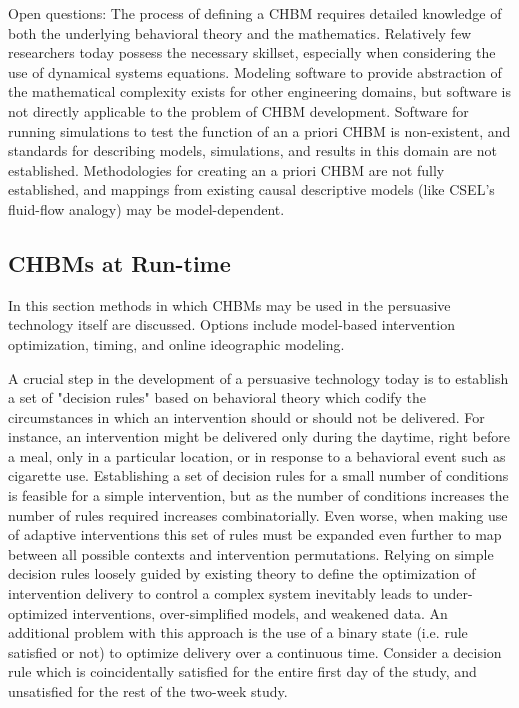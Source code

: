 \documentclass[runningheads,a4paper]{llncs}
\begin{document}
Open questions:
The process of defining a CHBM requires detailed knowledge of both the underlying behavioral theory and the mathematics. Relatively few researchers today possess the necessary skillset, especially when considering the use of dynamical systems equations.
Modeling software to provide abstraction of the mathematical complexity exists for other engineering domains, but software is not directly applicable to the problem of CHBM development. %
Software for running simulations to test the function of an a priori CHBM is non-existent, and standards for describing models, simulations, and results in this domain are not established.
Methodologies for creating an a priori CHBM are not fully established, and mappings from existing causal descriptive models (like CSEL’s fluid-flow analogy) may be model-dependent.

\subsection{CHBMs at Run-time}
In this section methods in which CHBMs may be used in the persuasive technology itself are discussed. 
Options include model-based intervention optimization, timing, and online ideographic modeling.

A crucial step in the development of a persuasive technology today is to establish a set of "decision rules" based on behavioral theory which codify the circumstances in which an intervention should or should not be delivered.
For instance, an intervention might be delivered only during the daytime, right before a meal, only in a particular location, or in response to a behavioral event such as cigarette use.
Establishing a set of decision rules for a small number of conditions is feasible for a simple intervention, but as the number of conditions increases the number of rules required increases combinatorially.
Even worse, when making use of adaptive interventions this set of rules must be expanded even further to map between all possible contexts and intervention permutations.
Relying on simple decision rules loosely guided by existing theory to define the optimization of intervention delivery to control a complex system inevitably leads to under-optimized interventions, over-simplified models, and weakened data.
An additional problem with this approach is the use of a binary state (i.e. rule satisfied or not) to optimize delivery over a continuous time.
Consider a decision rule which is coincidentally satisfied for the entire first day of the study, and unsatisfied for the rest of the two-week study.
\end{document}
